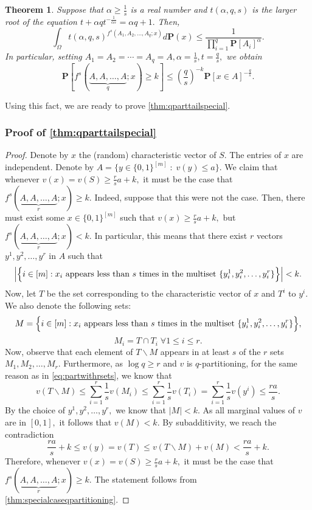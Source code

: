 \documentclass[11pt]{article}%
\newtheorem{theorem}{Theorem}
\numberwithin{theorem}{subsection}
\newcommand{\prob}{\mathbf{P}}
\begin{document}
\begin{theorem}
\label{thm:talagrandgenerals}
\label{thm:specialcaseqpartitioning}
Suppose that $\alpha\ge \frac{1}{s}$ is a real number and $t(\alpha, q,s)$ is the larger root of the equation $t + \alpha q t^{-\frac{1}{\alpha s}} = \alpha q + 1.$ Then, 
$$
\int_{\Omega}
t(\alpha, q, s)^{f^s(A_1, A_2, \ldots, A_q; x)}d\prob(x)\le 
\frac{1}{\prod_{i=1}^q \prob[A_i]^{\alpha}}.
$$
In particular, setting $A_1 = A_2 = \cdots = A_q = A, \alpha = \frac{1}{s}, t = \frac{q}{s},$ we obtain
$$\prob[f^s(\underbrace{A, A, \ldots, A}_{q}; x)\ge k]\le 
\left(\frac{q}{s}\right)^{-k}\prob[x \in A]^{-\frac{q}{s}}.$$
\end{theorem}

\noindent
Using this fact, we are ready to prove \cref{thm:qparttailspecial}.

\subsubsection{Proof of \cref{thm:qparttailspecial}}
\begin{proof}
Denote by $x$ the (random) characteristic vector of $S.$ The entries of $x$ are independent. Denote by $A=  \{y\in \{0,1\}^{[m]}\; : \; v(y)\le a\}.$ We claim that whenever $v(x) = v(S)\ge \frac{r}{s}a+k,$ it must be the case that $f^s(\underbrace{A,A,\ldots, A}_r; x)\ge k$. Indeed, suppose that this were not the case. Then, there must exist some $x\in \{0,1\}^{[m]}$ such that $v(x)\ge \frac{r}{s}a+k,$ but $f^s(\underbrace{A,A,\ldots, A}_r; x)< k.$ In particular, this means that there exist $r$ vectors $y^{1}, y^2, \ldots, y^r$ in $A$ such that 
$$
\Big{|}\Big{\{}i\in [m]: x_i \text{ appears less than $s$ times in the multiset }  \{y^1_i, y^2_i, \ldots, y^r_i\}\Big{\}}\Big{|}<k.
$$
Now, let $T$ be the set corresponding to the characteristic vector of $x$ and $T^i$ to $y^i.$ We also denote the following sets:
$$
M = \Big{\{}i\in [m]: x_i \text{ appears less than $s$ times in the multiset }  \{y^1_i, y^2_i, \ldots, y^r_i\}\Big{\}},
$$
$$
M_i = T\cap T_i\; \forall 1\le i \le r.$$
Now, observe that each element of $T\backslash M$ appears in at least $s$ of the $r$ sets  $M_1, M_2, \ldots, M_r.$ Furthermore, as $\log q\ge r$ and $v$ is $q$-partitioning, for the same reason as in \cref{eq:partwithrsets}, we know that 
$$
v(T\backslash M)\le \sum_{i=1}^r \frac{1}{s}v(M_i)\le 
\sum_{i=1}^r \frac{1}{s}v(T_i) = 
\sum_{i=1}^r \frac{1}{s}v(y^i)
\le 
\frac{ra}{s}.
$$
By the choice of $y^1, y^2, \ldots, y^r,$ we know that $|M|<k.$ As all marginal values of $v$ are in $[0,1],$ it follows that $v(M)<k.$ By subadditivity, we reach the contradiction
$$
\frac{ra}{s} + k \le 
v(y) = v(T)\le 
v(T\backslash M) + v(M)< 
\frac{ra}{s} + k.
$$
Therefore, whenever  $v(x) = v(S)\ge \frac{r}{s}a+k,$ it must be the case that $f^s(\underbrace{A,A,\ldots, A}_r; x)\ge k.$ The statement follows from \cref{thm:specialcaseqpartitioning}.
\end{proof}
\end{document}
